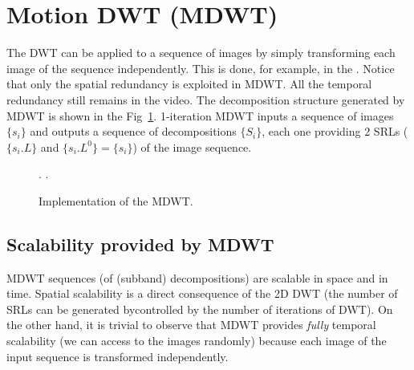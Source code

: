 
\section{Motion DWT (MDWT)}
The DWT can be applied to a sequence of images by simply transforming
each image of the sequence independently. This is done, for example,
in the . Notice that only the spatial redundancy is exploited in
MDWT. All the temporal redundancy still remains in the video. The
decomposition structure generated by MDWT is shown in the
Fig~\ref{fig:forward_MDWT}. 1-iteration MDWT inputs a sequence of
images $\{s_i\}$ and outputs a sequence of decompositions $\{S_i\}$,
each one providing 2 SRLs ($\{s_i.L\}$ and $\{s_i.L^0\}=\{s_i\}$) of
the image sequence.

\begin{figure}
  \centering {}
  .
  .
  \caption{Implementation of the MDWT.} %
  \label{fig:forward_MDWT}
\end{figure}

\subsection{Scalability provided by MDWT}
MDWT sequences (of (subband) decompositions) are scalable in space and
in time. Spatial scalability is a direct consequence of the 2D DWT
(the number of SRLs can be generated bycontrolled by the number of
iterations of DWT). On the other hand, it is trivial to observe that
MDWT provides \emph{fully} temporal scalability (we can access to the
images randomly) because each image of the input sequence is
transformed independently.

